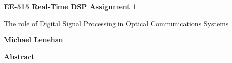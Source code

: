 \thispagestyle{plain}
\begin{center}
    \Large
    \textbf{EE-515 Real-Time DSP Assignment 1}

    \vspace{0.4cm}
    \large
    The role of Digital Signal Processing in Optical Communications Systems

    \vspace{0.4cm}
    \textbf{Michael Lenehan}

    \vspace{0.9cm}
    \textbf{Abstract}
\end{center}
\pagebreak
